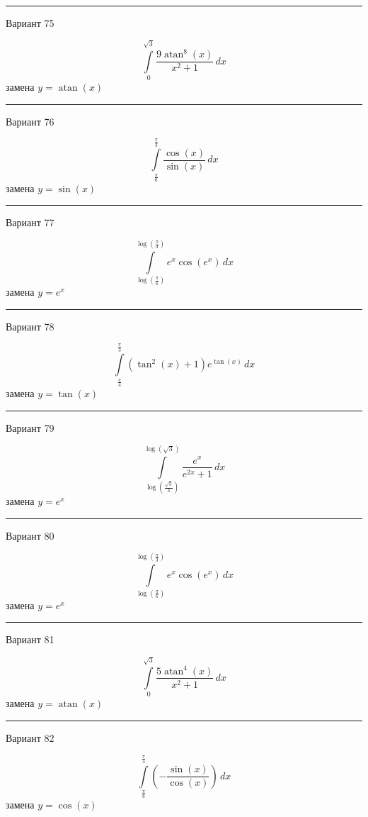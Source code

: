 \documentclass[11pt]{report}
\begin{document}
\rule{\textwidth}{.2mm}

Вариант 75

$$\int\limits_{0}^{\sqrt{3}} \frac{9 \operatorname{atan}^{8}{\left(x \right)}}{x^{2} + 1}\, dx$$
замена $y = \operatorname{atan}{\left(x \right)}$



\rule{\textwidth}{.2mm}

Вариант 76

$$\int\limits_{\frac{\pi}{6}}^{\frac{\pi}{3}} \frac{\cos{\left(x \right)}}{\sin{\left(x \right)}}\, dx$$
замена $y = \sin{\left(x \right)}$



\rule{\textwidth}{.2mm}

Вариант 77

$$\int\limits_{\log{\left(\frac{\pi}{6} \right)}}^{\log{\left(\frac{\pi}{3} \right)}} e^{x} \cos{\left(e^{x} \right)}\, dx$$
замена $y = e^{x}$



\rule{\textwidth}{.2mm}

Вариант 78

$$\int\limits_{\frac{\pi}{4}}^{\frac{\pi}{3}} \left(\tan^{2}{\left(x \right)} + 1\right) e^{\tan{\left(x \right)}}\, dx$$
замена $y = \tan{\left(x \right)}$



\rule{\textwidth}{.2mm}

Вариант 79

$$\int\limits_{\log{\left(\frac{\sqrt{3}}{3} \right)}}^{\log{\left(\sqrt{3} \right)}} \frac{e^{x}}{e^{2 x} + 1}\, dx$$
замена $y = e^{x}$



\rule{\textwidth}{.2mm}

Вариант 80

$$\int\limits_{\log{\left(\frac{\pi}{6} \right)}}^{\log{\left(\frac{\pi}{3} \right)}} e^{x} \cos{\left(e^{x} \right)}\, dx$$
замена $y = e^{x}$



\rule{\textwidth}{.2mm}

Вариант 81

$$\int\limits_{0}^{\sqrt{3}} \frac{5 \operatorname{atan}^{4}{\left(x \right)}}{x^{2} + 1}\, dx$$
замена $y = \operatorname{atan}{\left(x \right)}$



\rule{\textwidth}{.2mm}

Вариант 82

$$\int\limits_{\frac{\pi}{6}}^{\frac{\pi}{4}} \left(- \frac{\sin{\left(x \right)}}{\cos{\left(x \right)}}\right)\, dx$$
замена $y = \cos{\left(x \right)}$
\end{document}
